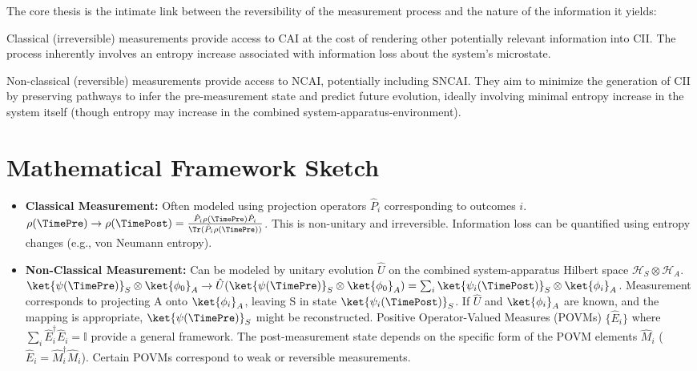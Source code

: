 	The core thesis is the intimate link between the reversibility of the measurement process and the nature of the information it yields:
	
	\begin{proposition}
		Classical (irreversible) measurements provide access to CAI at the cost of rendering other potentially relevant information into CII. The process inherently involves an entropy increase associated with information loss about the system's microstate.
	\end{proposition}
	
	\begin{proposition}
		Non-classical (reversible) measurements provide access to NCAI, potentially including SNCAI. They aim to minimize the generation of CII by preserving pathways to infer the pre-measurement state and predict future evolution, ideally involving minimal entropy increase in the system itself (though entropy may increase in the combined system-apparatus-environment).
	\end{proposition}
	
	
	\section{Mathematical Framework Sketch}
	
	\begin{itemize}
		\item \textbf{Classical Measurement:} Often modeled using projection operators $\hat{P}_i$ corresponding to outcomes $i$. $\rho(\TimePre) \rightarrow \rho(\TimePost) = \frac{\hat{P}_i \rho(\TimePre) \hat{P}_i}{\Tr(\hat{P}_i \rho(\TimePre))}$. This is non-unitary and irreversible. Information loss can be quantified using entropy changes (e.g., von Neumann entropy).
		\item \textbf{Non-Classical Measurement:} Can be modeled by unitary evolution $\hat{U}$ on the combined system-apparatus Hilbert space $\mathcal{H}_S \otimes \mathcal{H}_A$. $\ket{\psi(\TimePre)}_S \otimes \ket{\phi_0}_A \rightarrow \hat{U} (\ket{\psi(\TimePre)}_S \otimes \ket{\phi_0}_A) = \sum_i \ket{\psi_i(\TimePost)}_S \otimes \ket{\phi_i}_A$. Measurement corresponds to projecting A onto $\ket{\phi_i}_A$, leaving S in state $\ket{\psi_i(\TimePost)}_S$. If $\hat{U}$ and $\ket{\phi_i}_A$ are known, and the mapping is appropriate, $\ket{\psi(\TimePre)}_S$ might be reconstructed. Positive Operator-Valued Measures (POVMs) $\{ \hat{E}_i \}$ where $\sum_i \hat{E}_i^\dagger \hat{E}_i = \mathbb{I}$ provide a general framework. The post-measurement state depends on the specific form of the POVM elements $\hat{M}_i$ ($\hat{E}_i = \hat{M}_i^\dagger \hat{M}_i$). Certain POVMs correspond to weak or reversible measurements.
	\end{itemize}
	
